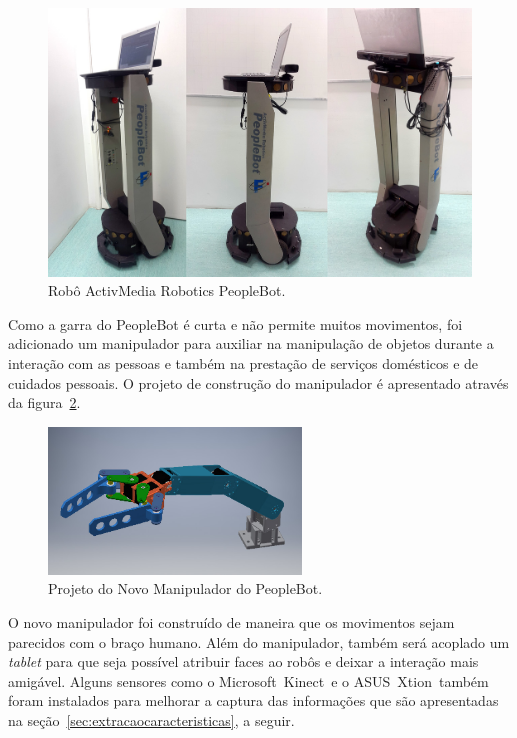 \begin{figure}[ht!]
	\centering
	\includegraphics[width=\textwidth]{images/peoplebot.jpg}
	\caption{Robô ActivMedia Robotics PeopleBot.}
	\label{fig:peoplebot}
\end{figure}

Como a garra do PeopleBot é curta e não permite muitos movimentos, foi adicionado um manipulador para auxiliar na manipulação de objetos durante a interação com as pessoas e também na prestação de serviços domésticos e de cuidados pessoais. O projeto de construção do manipulador é apresentado através da figura~\ref{fig:manipulador}.

\begin{figure}[ht!]
	\centering
	\includegraphics[width=0.6\textwidth]{images/manipulador.jpg}
	\caption{Projeto do Novo Manipulador do PeopleBot.}
	\label{fig:manipulador}
\end{figure}

O novo manipulador foi construído de maneira que os movimentos sejam parecidos com o braço humano. Além do manipulador, também será acoplado um \emph{tablet} para que seja possível atribuir faces ao robôs e deixar a interação mais amigável. Alguns sensores como o Microsoft\textregistered\ Kinect\textregistered\ e o ASUS\textregistered\ Xtion\textregistered\ também foram instalados para melhorar a captura das informações que são apresentadas na seção~\ref{sec:extracaocaracteristicas}, a seguir.

